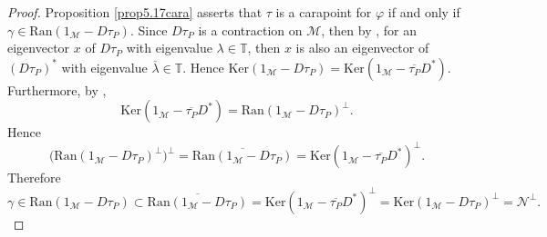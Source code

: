 \documentclass[11pt, reqno]{amsart}
\newcommand\1{\boldsymbol {1}}
\numberwithin{equation}{section}
\begin{document}
\begin{proof}
 Proposition \ref{prop5.17cara} asserts that $\tau$ is a carapoint for $\varphi$ if and only if $\gamma\in\mathrm{Ran}(1_{\mathcal{M}}-D\tau_{P})$. Since $D\tau_{P}$ is a contraction on $\mathcal{M}$, then by 
 \cite[Proposition 3.1]{FoiasNagy}, for an eigenvector $x$ of $D\tau_{P}$ with eigenvalue $\lambda\in\mathbb{T}$, then $x$ is also an eigenvector of $(D\tau_{P})^{*}$ with eigenvalue $\overline{\lambda}\in\mathbb{T}$. Hence $\mathrm{Ker}(1_{\mathcal{M}}-D\tau_{P})=\mathrm{Ker}(1_{\mathcal{M}}-\overline{\tau_{P}}D^{*})$. Furthermore, by \cite[Lemma 6.11]{RynneYoungson},
$$\mathrm{Ker}(1_{\mathcal{M}}-\overline{\tau_{P}}D^{*}) = \mathrm{Ran}(1_{\mathcal{M}}-D\tau_{P})^{\perp}.$$
Hence
$$\Big(\mathrm{Ran}(1_{\mathcal{M}}-D\tau_{P})^{\perp}\Big)^{\perp}=\overline{\mathrm{Ran}(1_{\mathcal{M}}-D\tau_{P})} = \mathrm{Ker}(1_{\mathcal{M}}-\overline{\tau_{P}}D^{*})^{\perp}.$$
Therefore
$$\gamma\in\mathrm{Ran}(1_{\mathcal{M}}-D\tau_{P}) \subset \overline{\mathrm{Ran}(1_{\mathcal{M}}-D\tau_{P})}=\mathrm{Ker}(1_{\mathcal{M}}-\overline{\tau_{P}}D^{*})^{\perp}=\mathrm{Ker}(1_{\mathcal{M}}-D\tau_{P})^{\perp}=\mathcal{N}^{\perp}.$$\end{proof}
\end{document}
